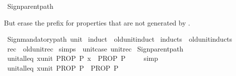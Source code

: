 \begin{isabellebody}
%
\endisadelimML
%
\isatagML
{}\isamarkupfalse%
\ {\isacartoucheopen}Sign{\isachardot}{\kern0pt}parent{\isacharunderscore}{\kern0pt}path{\isacartoucheclose}%
\endisatagML
{\isafoldML}%
%
\isadelimML
%
\endisadelimML
%
\begin{isamarkuptext}%
But erase the prefix for properties that are not generated by .%
\end{isamarkuptext}\isamarkuptrue%
%
\isadelimML
%
\endisadelimML
%
\isatagML
{}\isamarkupfalse%
\ {\isacartoucheopen}Sign{\isachardot}{\kern0pt}mandatory{\isacharunderscore}{\kern0pt}path\ {\isachardoublequote}{\kern0pt}unit{\isachardoublequote}{\kern0pt}{\isacartoucheclose}%
\endisatagML
{\isafoldML}%
%
\isadelimML
%
\endisadelimML
\isanewline
\isanewline
{}\isamarkupfalse%
\ induct\ {\isacharequal}{\kern0pt}\ old{\isachardot}{\kern0pt}unit{\isachardot}{\kern0pt}induct\isanewline
{}\isamarkupfalse%
\ inducts\ {\isacharequal}{\kern0pt}\ old{\isachardot}{\kern0pt}unit{\isachardot}{\kern0pt}inducts\isanewline
{}\isamarkupfalse%
\ rec\ {\isacharequal}{\kern0pt}\ old{\isachardot}{\kern0pt}unit{\isachardot}{\kern0pt}rec\isanewline
{}\isamarkupfalse%
\ simps\ {\isacharequal}{\kern0pt}\ unit{\isachardot}{\kern0pt}case\ unit{\isachardot}{\kern0pt}rec\isanewline
%
\isadelimML
\isanewline
%
\endisadelimML
%
\isatagML
{}\isamarkupfalse%
\ {\isacartoucheopen}Sign{\isachardot}{\kern0pt}parent{\isacharunderscore}{\kern0pt}path{\isacartoucheclose}%
\endisatagML
{\isafoldML}%
%
\isadelimML
\isanewline
%
\endisadelimML
\isanewline
{}\isamarkupfalse%
\ unit{\isacharunderscore}{\kern0pt}all{\isacharunderscore}{\kern0pt}eq{}{\isacharcolon}{\kern0pt}\ {\isachardoublequoteopen}{\isacharparenleft}{\kern0pt}{\isasymAnd}x{\isacharcolon}{\kern0pt}{\isacharcolon}{\kern0pt}unit{\isachardot}{\kern0pt}\ PROP\ P\ x{\isacharparenright}{\kern0pt}\ {\isasymequiv}\ PROP\ P\ {\isacharparenleft}{\kern0pt}{\isacharparenright}{\kern0pt}{\isachardoublequoteclose}\isanewline
%
\isadelimproof
\ \ %
\endisadelimproof
%
\isatagproof
{}\isamarkupfalse%
\ simp%
\endisatagproof
{\isafoldproof}%
%
\isadelimproof
\isanewline
%
\endisadelimproof
\isanewline
{}\isamarkupfalse%
\ unit{\isacharunderscore}{\kern0pt}all{\isacharunderscore}{\kern0pt}eq{}{\isacharcolon}{\kern0pt}\ {\isachardoublequoteopen}{\isacharparenleft}{\kern0pt}{\isasymAnd}x{\isacharcolon}{\kern0pt}{\isacharcolon}{\kern0pt}unit{\isachardot}{\kern0pt}\ PROP\ P{\isacharparenright}{\kern0pt}\ {\isasymequiv}\ PROP\ P{\isachardoublequoteclose}\isanewline

\end{isabellebody}
